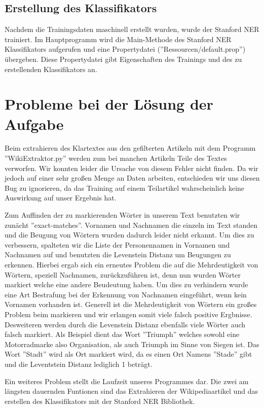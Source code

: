 \documentclass[a4paper]{article}
\begin{document}
	\subsection{Erstellung des Klassifikators}
		Nachdem die Trainingsdaten maschinell erstellt wurden, wurde der Stanford NER trainiert.
		Im Hauptprogramm wird die Main-Methode des Stanford NER Klassifikators aufgerufen und eine Propertydatei (''Ressourcen/default.prop'') übergeben. 
		Diese Propertydatei gibt Eigenschaften des Trainings und des zu erstellenden Klassifikators an.

\section{Probleme bei der Lösung der Aufgabe}
	Beim extrahieren des Klartextes aus den gefilterten Artikeln mit dem Programm ''WikiExtraktor.py'' werden zum bei manchen Artikeln Teile des Textes verworfen. 
	Wir konnten leider die Ursache von diesem Fehler nicht finden. 
	Da wir jedoch auf einer sehr großen Menge an Daten arbeiten, entschieden wir uns diesen Bug zu ignorieren, da das Training auf einem Teilartikel wahrscheinlich keine Auswirkung auf unser Ergebnis hat.
	
	Zum Auffinden der zu markierenden Wörter in unserem Text benutzten wir zunächt ''exact-matches''. Vornamen und Nachnamen die einzeln im Text standen und die Beugung von Wörtern wurden dadurch leider nicht erkannt. 
	Um dies zu verbessern, spalteten wir die Liste der Personennamen in Vornamen und Nachnamen auf und benutzten die Levenstein Distanz um Beugungen zu erkennen. 
	Hierbei ergab sich ein erneutes Problem die auf die Mehrdeutigkeit von Wörtern, speziell Nachnamen, zurückzuführen ist, denn nun wurden Wörter markiert welche eine andere Beudeutung haben. 
	Um dies zu verhindern wurde eine Art Bestrafung bei der Erkennung von Nachnamen eingeführt, wenn kein Vornamen vorhanden ist. 
	Generell ist die Mehrdeutigkeit von Wörtern ein großes Problem beim markieren und wir erlangen somit viele falsch positive Ergbnisse. 
	Desweiteren werden durch die Levenstein Distanz ebenfalls viele Wörter auch falsch markiert. 
	Als Beispiel dient das Wort ''Triumph'' welches sowohl eine Motorradmarke also Organisation, als auch Triumph im Sinne von Siegen ist. Das Wort ''Stadt'' wird als Ort markiert wird, da es einen Ort Namens ''Stade'' gibt und die Leventstein Distanz lediglich 1 beträgt.
	
	Ein weiteres Problem stellt die Laufzeit unseres Programmes dar. 
	Die zwei am längsten dauernden Funtionen sind das Extrahieren der Wikipediaartikel und das erstellen des Klassifikators mit der Stanford NER Bibliothek.
\end{document}
